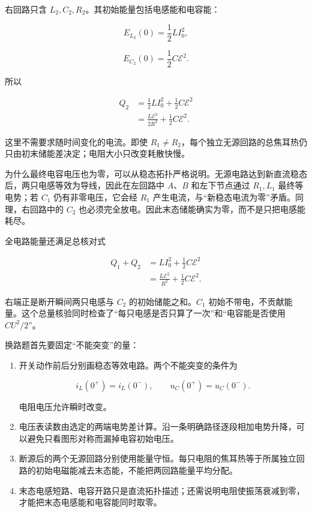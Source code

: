 \documentclass[12pt,a4paper,UTF8]{ctexart}
\begin{document}
右回路只含 \(L_2,C_2,R_2\)。其初始能量包括电感能和电容能：

\[E_{L_2}(0)=\frac12LI_0^2,\]

\[E_{C_2}(0)=\frac12C\mathcal E^2.\]

所以

\[\begin{aligned}
Q_2
&=\frac12LI_0^2+\frac12C\mathcal E^2\\
&=\boxed{\frac{L\mathcal E^2}{2R^2}+\frac12C\mathcal E^2}.
\end{aligned} \tag{35}\]

这里不需要求随时间变化的电流。即使
\(R_1\ne R_2\)，每个独立无源回路的总焦耳热仍只由初末储能差决定；电阻大小只改变耗散快慢。

为什么最终电容电压也为零，可以从稳态拓扑严格说明。无源电路达到新直流稳态后，两只电感等效为导线，因此在左回路中
\(A\)、\(B\) 和左下节点通过 \(R_1,L_1\) 最终等电势；若 \(C_1\)
仍有非零电压，它会经 \(R_1\)
产生电流，与``新稳态电流为零''矛盾。同理，右回路中的 \(C_2\)
也必须完全放电。因此末态储能确实为零，而不是只把电感能耗尽。

全电路能量还满足总核对式

\[\begin{aligned}
Q_1+Q_2
&=LI_0^2+\frac12C\mathcal E^2\\
&=\frac{L\mathcal E^2}{R^2}+\frac12C\mathcal E^2.
\end{aligned} \tag{35a}\]

右端正是断开瞬间两只电感与 \(C_2\) 的初始储能之和。\(C_1\)
初始不带电，不贡献能量。这个总量核验同时检查了``每只电感是否只算了一次''和``电容能是否使用
\(CU^2/2\)''。

换路题首先要固定``不能突变''的量：

\begin{enumerate}
\def\labelenumi{\arabic{enumi}.}
\item
  开关动作前后分别画稳态等效电路。两个不能突变的条件为

  \[i_L(0^+)=i_L(0^-),\qquad
  u_C(0^+)=u_C(0^-).\]

  电阻电压允许瞬时改变。
\item
  电压表读数由选定的两端电势差计算。沿一条明确路径逐段相加电势升降，可以避免只看图形对称而漏掉电容初始电压。
\item
  断源后的两个无源回路分别使用能量守恒。每只电阻的焦耳热等于所属独立回路的初始电磁能减去末态能，不能把两回路能量平均分配。
\item
  末态电感短路、电容开路只是直流拓扑描述；还需说明电阻使振荡衰减到零，才能把末态电感能和电容能同时取零。
\end{enumerate}
\end{document}
